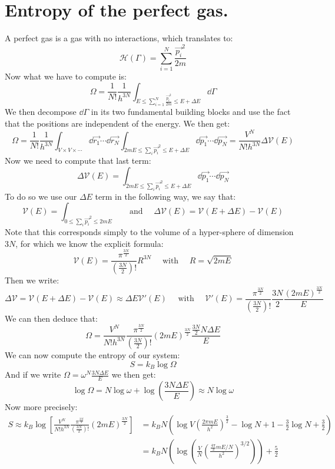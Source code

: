 \documentclass[10pt,a4paper]{book}
\begin{document}
\section{Entropy of the perfect gas.}
A perfect gas is a gas with no interactions, which translates to:
\[
\mathcal{H}(\Gamma) = \sum_{i = 1}^N \frac{\overrightarrow{p_i}^2}{2m}
\]
Now what we have to compute is:
\[
\Omega = \frac{1}{N!}\frac{1}{h^{3N}}\int_{E \leq \sum_{i = 1}^N\frac{\overrightarrow{p_i}^2}{2m} \leq E + \Delta E} \dd\Gamma
\]
We then decompose $\dd\Gamma$ in its two fundamental building blocks and use the fact that the positions are independent of the energy. We then get:
\[
\Omega = \frac{1}{N!}\frac{1}{h^{3N}}\int_{V\times V\times\cdots} \dd\overrightarrow{r_1}\cdots\dd\overrightarrow{r_N}\int_{2mE \leq \sum_i \overrightarrow{p_i}^2 \leq E + \Delta E} \dd\overrightarrow{p_1} \cdots \dd\overrightarrow{p_N} = \frac{V^N}{N! h^{3N}} \Delta \mathcal{V}(E)
\]
Now we need to compute that last term:
\[
\Delta \mathcal{V}(E) = \int_{2mE \leq \sum_i \overrightarrow{p_i}^2 \leq E + \Delta E} \dd \overrightarrow{p_1}\cdots\dd\overrightarrow{p_N}
\]
To do so we use our $\Delta E$ term in the following way, we say that:
\[
\mathcal{V}(E) = \int_{0 \leq \sum_i \overrightarrow{p_i}^2 \leq 2mE} \quad \text{ and } \quad \Delta \mathcal{V}(E) = \mathcal{V}(E + \Delta E) - \mathcal{V}(E)
\]
Note that this corresponds simply to the volume of a hyper-sphere of dimension $3N$, for which we know the explicit formula:
\[
\mathcal{V}(E) = \frac{\pi^{\frac{3N}{2}}}{(\frac{3N}{2})!}R^{3N} \quad \text{ with } \quad R = \sqrt{2mE}
\]
Then we write:
\[
\Delta \mathcal{V} = \mathcal{V}(E + \Delta E) - \mathcal{V}(E) \approx \Delta E \mathcal{V}'(E) \quad \text{ with } \quad \mathcal{V}'(E) = \frac{\pi^{\frac{3N}{2}}}{(\frac{3N}{2})!} \frac{3N}{2} \frac{(2mE)^{\frac{3N}{2}}}{E}
\]
We can then deduce that:
\[
\Omega = \frac{V^N}{N!h^{3N}} \frac{\pi^{\frac{3N}{2}}}{(\frac{3N}{2})!}(2mE)^{\frac{3N}{2}}\frac{\frac{3N}{2}N\Delta E}{E}
\]
We can now compute the entropy of our system:
\[
S = k_B\log\Omega
\]
And if we write $\Omega = \omega^N \frac{3N\Delta E}{E}$ we then get:
\[
\log\Omega = N\log \omega + \log(\frac{3N\Delta E}{E}) \approx N\log\omega
\]
Now more precisely:
\begin{align*}
S \approx k_B \log \left[ \frac{V^N}{N! h^{3N}} \frac{\pi^{\frac{3N}{2}}}{(\frac{3N}{2})!} (2mE)^{\frac{3N}{2}} \right] &= k_B N \left( \log V \left( \frac{2\pi m E}{h^2} \right)^{\frac{3}{2}} - \log N + 1 - \frac{3}{2}\log N + \frac{3}{2} \right)\\
&= k_B N\left( \log\left( \frac{V}{N}\left(\frac{\frac{4\pi}{3}mE/N}{h^2}\right)^{3/2} \right) \right) + \frac{5}{2}
\end{align*}
\end{document}
